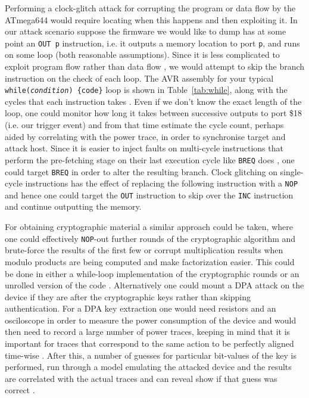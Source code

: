 Performing a clock-glitch attack for corrupting the program or data flow by the ATmega644 would require locating when this happens and then exploiting it. In our attack scenario suppose the firmware we would like to dump has at some point an \texttt{OUT p} instruction, i.e. it outputs a memory location to port \texttt{p}, and runs on some loop (both reasonable assumptions). Since it is less complicated to exploit program flow rather than data flow \citep{glitches_paper}, we would attempt to skip the branch instruction on the check of each loop. The AVR assembly for your typical  \texttt{while(\emph{condition}) \{code\}} loop is shown in Table~\ref{tab:while}, along with the cycles that each instruction takes \citep{atmega_manual}. Even if we don't know the exact length of the loop, one could monitor how long it takes between successive outputs to port \$18 (i.e. our trigger event) and from that time estimate the cycle count, perhaps aided by correlating with the power trace, in order to synchronise target and attack host. Since it is easier to inject faults on multi-cycle instructions that perform the pre-fetching stage on their last execution cycle like \texttt{BREQ} does \citep{glitches_paper}, one could target \texttt{BREQ} in order to alter the resulting branch. Clock glitching on single-cycle instructions has the effect of replacing the following instruction with a \texttt{NOP} \citep{glitches_paper} and hence one could target the \texttt{OUT} instruction to skip over the \texttt{INC} instruction and continue outputting the memory.

For obtaining cryptographic material a similar approach could be taken, where one could effectively \texttt{NOP}-out further rounds of the cryptographic algorithm and brute-force the results of the first few \citep{glitches_paper}\citep{sergei:thesis} or corrupt multiplication results when modulo products are being computed and make factorization easier\citep{anderson:cautionary_note}. This could be done in either a while-loop implementation of the cryptographic rounds or an unrolled version of the code \citep{glitches_paper}. Alternatively one could mount a DPA attack on the device if they are after the cryptographic keys rather than skipping authentication. For a DPA key extraction one would need resistors and an osciloscope in order to measure the power consumption of the device \citep{sergei:thesis} \citep{kocher:DPA} \citep{book:power_analysis} and would then need to record a large number of power traces, keeping in mind that it is important for traces that correspond to the same action to be perfectly aligned time-wise \citep{book:power_analysis}. After this, a number of guesses for particular bit-values of the key is performed, run through a model emulating the attacked device and the results are correlated with the actual traces and can reveal show if that guess was correct \citep{book:power_analysis}.

